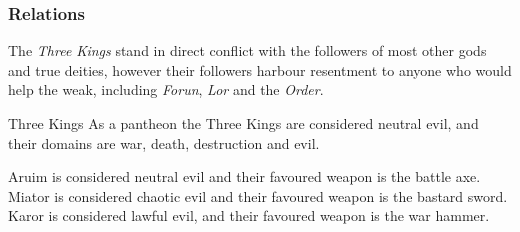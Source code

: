 \subsubsection*{Relations}

The \emph{Three Kings} stand in direct conflict with the followers of most
other gods and true deities, however their followers harbour resentment to
anyone who would help the weak, including \emph{Forun}, \emph{Lor} and the
\emph{Order}.

\begin{35e}{Three Kings}
  As a pantheon the Three Kings are considered neutral evil, and their domains
  are war, death, destruction and evil.

  Aruim is considered neutral evil and their favoured weapon is the battle axe.
  Miator is considered chaotic evil and their favoured weapon is the bastard
  sword. Karor is considered lawful evil, and their favoured weapon is the
  war hammer.
\end{35e}
